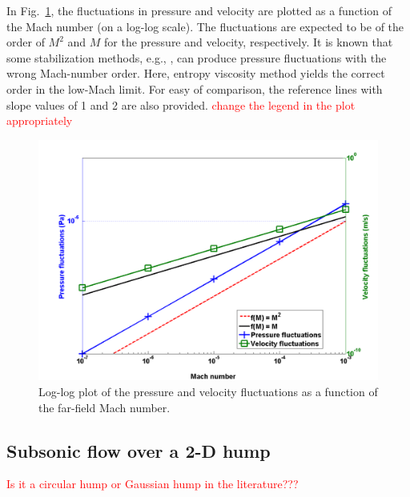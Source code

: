 \documentclass[preprint,10pt]{elsarticle}
\newcommand{\fig}[1]{Fig.~\ref{#1}}                      %
\newcommand{\tcr}[1]{\textcolor{red}{#1}}
\begin{document}
%
In \fig{fig:pressure_vel_fluc}, the fluctuations in pressure and velocity are plotted as a function of the Mach number (on a log-log scale). The fluctuations are expected to be of the order of $M^2$ and $M$ for the pressure and velocity, respectively. It is known that some stabilization methods, e.g., \cite{guillard, rajoute'dautres exemples}, can produce pressure fluctuations with the wrong Mach-number order. Here, entropy viscosity method yields the correct order in the low-Mach limit. For easy of comparison, the reference lines with slope values of 1 and 2 are also provided. \tcr{change the legend in the plot appropriately}
%
\begin{figure}[H]
\centering
\includegraphics[width=\textwidth]{pressure_fluctuation.png}
\caption{Log-log plot of the pressure and velocity fluctuations as a function of the far-field Mach number.}
\label{fig:pressure_vel_fluc}
\end{figure}

\subsection{Subsonic flow over a 2-D hump} \label{sec:hump}

\tcr{Is it a circular hump or Gaussian hump in the literature???}
\end{document}
